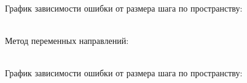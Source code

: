 \documentclass[12pt]{article}
\begin{document}
\begin{enumerate}
        \begin{figure}[h]
            \label{ris:image}
        \end{figure}\\
        \newpage
        График зависимости ошибки от размера шага по пространству:
        \begin{figure}[h]
            \label{ris:image}
        \end{figure}\\
        Метод переменных направлений:
        \begin{figure}[h]
            \label{ris:image}
        \end{figure}\\
        \newpage
        График зависимости ошибки от размера шага по пространству:
        \begin{figure}[h]
            \label{ris:image}
        \end{figure}\\




\end{enumerate}
\end{document}
